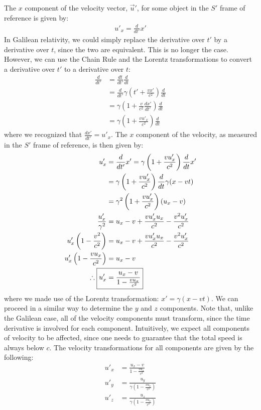 The $x$ component of the velocity vector, $\vec u'$, for some object in the $S'$ frame of reference is given by:
\begin{align*}
u'_x = \frac{d}{dt'} x'
\end{align*}
In Galilean relativity, we could simply replace the derivative over $t'$ by a derivative over $t$, since the two are equivalent. This is no longer the case. However, we can use the Chain Rule and the Lorentz transformations to convert a derivative over $t'$ to a derivative over $t$:
\begin{align*}
\frac{d}{dt'} &= \frac{dt}{dt'}\frac{d}{dt}\\
&= \frac{d}{dt'} \gamma\left(t'+\frac{vx'}{c^2} \right)\frac{d}{dt}\\
&=\gamma \left(1+\frac{v}{c^2}\frac{dx'}{dt'}\right)\frac{d}{dt}\\
&=\gamma \left(1+\frac{vu'_x}{c^2}\right)\frac{d}{dt}
\end{align*}
where we recognized that $\frac{dx'}{dt'}=u'_x$. The $x$ component of the velocity, as measured in the $S'$ frame of reference, is then given by:
\begin{align*}
u'_x &= \frac{d}{dt'} x' = \gamma \left(1+\frac{vu'_x}{c^2}\right)\frac{d}{dt}x'\\
&=\gamma \left(1+\frac{vu'_x}{c^2}\right)\frac{d}{dt}\gamma (x-vt)\\
&=\gamma^2 \left(1+\frac{vu'_x}{c^2}\right)(u_x -v)\\
\frac{u'_x}{\gamma^2}&=u_x -v +\frac{vu'_xu_x}{c^2}-\frac{v^2u'_x}{c^2}\\
u'_x\left (1-\frac{v^2}{c^2}\right)&=u_x -v +\frac{vu'_xu_x}{c^2}-\frac{v^2u'_x}{c^2}\\
u'_x \left( 1- \frac{vu_x}{c^2}\right) &=u_x -v\\
\therefore \; \Aboxed{u'_x&=\frac{u_x -v}{1- \frac{vu_x}{c^2}}}
\end{align*}
where we made use of the Lorentz transformation: $x'=\gamma (x-vt)$. We can proceed in a similar way to determine the $y$ and $z$ components. Note that, unlike the Galilean case, all of the velocity components must transform, since the time derivative is involved for each component. Intuitively, we expect all components of velocity to be affected, since one needs to guarantee that the total speed is always below $c$. The velocity transformations for all components are given by the following:
\begin{align*}
u'_x&=\frac{u_x -v}{1- \frac{vu_x}{c^2}}\\
u'_y &=\frac{u_y}{\gamma\left(1- \frac{vu_x}{c^2}\right)}\\
u'_z &=\frac{u_z}{\gamma\left(1- \frac{vu_x}{c^2}\right)}
\end{align*}
